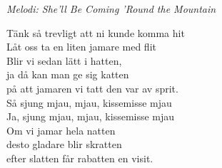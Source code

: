 {\footnotesize\textit{Melodi: She'll Be Coming 'Round the Mountain}}\par
\vspace{10pt}
Tänk så trevligt att ni kunde komma hit\\
Låt oss ta en liten jamare med flit\\
Blir vi sedan lätt i hatten, \\
ja då kan man ge sig katten \\
på att jamaren vi tatt den var av sprit.\\
Så sjung mjau, mjau, kissemisse mjau\\
Ja, sjung mjau, mjau, kissemisse mjau\\
Om vi jamar hela natten\\
desto gladare blir skratten\\
efter slatten får rabatten en visit.

